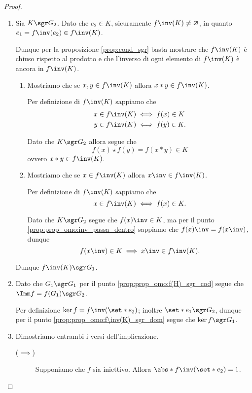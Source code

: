 \begin{proof}
\begin{enumerate}[label={(\roman*)}]
\begin{enumerate}[label={(\arabic*)}]
            Dunque $f(h\inv) \in f(H)$, ma per il punto \ref{prop:prop_omo:inv_passa_dentro} sappiamo che \[
                f(h\inv) = f(h)\inv = x\inv \in f(H).   
            \]
        \end{enumerate}
        Dunque $f(H) \sgr G_2$.
        \item Sia $K \sgr G_2$. Dato che $e_2 \in K$, sicuramente $f\inv(K) \neq \varnothing$, in quanto $e_1 = f\inv(e_2) \in f\inv(K)$.
        
        Dunque per la proposizione \ref{prop:cond_sgr} basta mostrare che $f\inv(K)$ è chiuso rispetto al prodotto e che l'inverso di ogni elemento di $f\inv(K)$ è ancora in $f\inv(K)$.

        \begin{enumerate}[label={(\arabic*)}]
            \item Mostriamo che se $x, y \in f\inv(K)$ allora $x* y \in f\inv(K)$.
            
            Per definizione di $f\inv(K)$ sappiamo che \begin{align*}
                x \in f\inv(K) &\iff f(x) \in K \\
                y \in f\inv(K) &\iff f(y) \in K.
            \end{align*}
            
            Dato che $K \sgr G_2$ allora segue che \[
                f(x) \star f(y) = f(x * y) \in K     
            \] ovvero $x * y \in f\inv(K)$.
            \item Mostriamo che se $x \in f\inv(K)$ allora $x\inv \in f\inv(K)$.
            
            Per definizione di $f\inv(K)$ sappiamo che \[
                x \in f\inv(K) \iff f(x) \in K.    
            \] 
            
            Dato che $K \sgr G_2$ segue che $f(x)\inv \in K$, ma per il punto \ref{prop:prop_omo:inv_passa_dentro} sappiamo che $f(x)\inv = f(x\inv)$, dunque \[
                f(x\inv) \in K \implies x\inv \in f\inv(K).  
            \]
        \end{enumerate}
        Dunque $f\inv(K) \sgr G_1$.
        \item Dato che $G_1 \sgr G_1$ per il punto \ref{prop:prop_omo:f(H)_sgr_cod} segue che $\Imm f = f(G_1) \sgr G_2$.
        
        Per definizione $\ker f = f\inv(\set*{e_2})$; inoltre $\set*{e_1} \sgr G_2$, dunque per il punto \ref{prop:prop_omo:f\inv(K)_sgr_dom} segue che $\ker f \sgr G_1$.
        \item Dimostriamo entrambi i versi dell'implicazione.
        \begin{description}
            \item[($\implies$)] Supponiamo che $f$ sia iniettivo. Allora $\abs*{f\inv(\set*{e_2})} = 1$.
            

\end{description}
\end{enumerate}
\end{proof}
